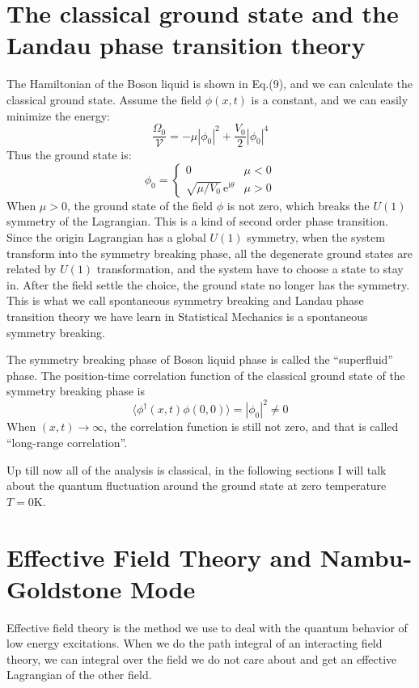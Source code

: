 \documentclass{article}
\newcommand{\im}{\mathrm{i}}
\newcommand{\ep}{\mathrm{e}}
\begin{document}
\section{The classical ground state and the Landau phase transition theory}
The Hamiltonian of the Boson liquid is shown in Eq.(9), and we can calculate the classical ground state. Assume the field $\phi(x,t)$ is a constant, and we can easily minimize the energy:
\begin{equation}
\frac{\Omega_0}{\mathcal{V}} = -\mu |\phi_0|^2 +\frac{V_0}{2}|\phi_0|^4
\end{equation}
Thus the ground state is:
\begin{equation}
\phi_0 =\left\{\begin{array}{cl}
0 & \mu<0\\ \sqrt{\mu/V_0}\,\ep^{\im\theta} & \mu>0
\end{array}\right.
\end{equation}
When $\mu>0$, the ground state of the field $\phi$ is not zero, which breaks the $U(1)$ symmetry of the Lagrangian. This is a kind of second order phase transition. Since the origin Lagrangian has a global $U(1)$ symmetry, when the system transform into the symmetry breaking phase, all the degenerate ground states are related by $U(1)$ transformation, and the system have to choose a state to stay in. After the field settle the choice, the ground state no longer has the symmetry. This is what we call spontaneous symmetry breaking and Landau phase transition theory we have learn in Statistical Mechanics is a spontaneous symmetry breaking.

The symmetry breaking phase of Boson liquid phase is called the ``superfluid'' phase. The position-time correlation function of the classical ground state of the symmetry breaking phase is
$$
\langle \phi^\dagger(x,t)\phi(0,0)\rangle = |\phi_0|^2 \neq 0
$$
When $(x,t)\rightarrow \infty$, the correlation function is still not zero, and that is called ``long-range correlation''.  

Up till now all of the analysis is classical, in the following sections I will talk about the quantum fluctuation around the ground state at zero temperature $T=0\mathrm{K}$.

\section{Effective Field Theory and Nambu-Goldstone Mode}
Effective field theory is the method we use to deal with the quantum behavior of low energy excitations. When we do the path integral of an interacting field theory, we can integral over the field we do not care about and get an effective Lagrangian of the other field. 
\end{document}
